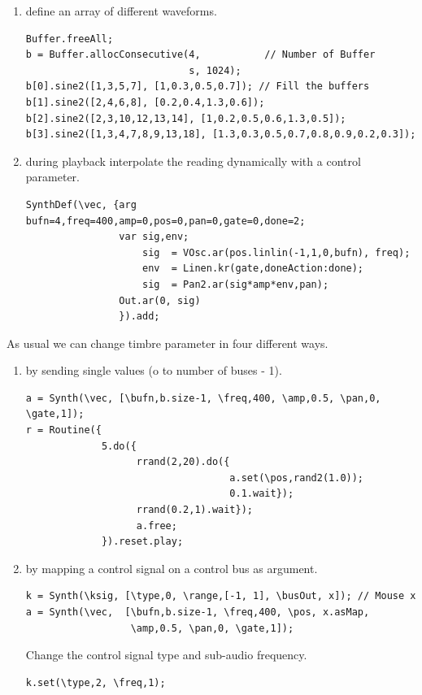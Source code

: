 \begin{enumerate}
\def\labelenumi{\arabic{enumi}.}
\tightlist
\item define an array of different waveforms.
\begin{lstlisting}[frame=single] 
Buffer.freeAll;
b = Buffer.allocConsecutive(4,           // Number of Buffer
                            s, 1024);  
b[0].sine2([1,3,5,7], [1,0.3,0.5,0.7]); // Fill the buffers
b[1].sine2([2,4,6,8], [0.2,0.4,1.3,0.6]);
b[2].sine2([2,3,10,12,13,14], [1,0.2,0.5,0.6,1.3,0.5]);
b[3].sine2([1,3,4,7,8,9,13,18], [1.3,0.3,0.5,0.7,0.8,0.9,0.2,0.3]);
\end{lstlisting}
\item during playback interpolate the reading dynamically with a control parameter.

\begin{lstlisting}[frame=single, caption=Vetorial synthesis model] 
SynthDef(\vec, {arg bufn=4,freq=400,amp=0,pos=0,pan=0,gate=0,done=2;
                var sig,env;
                    sig  = VOsc.ar(pos.linlin(-1,1,0,bufn), freq);
                    env  = Linen.kr(gate,doneAction:done);
                    sig  = Pan2.ar(sig*amp*env,pan);
                Out.ar(0, sig)
                }).add;
\end{lstlisting}
\end{enumerate}

As usual we can change timbre parameter in four different ways.

\begin{enumerate}
\def\labelenumi{\arabic{enumi}.}
\tightlist
\item by sending single values (o to number of buses - 1).
\begin{lstlisting}[frame=single] 
a = Synth(\vec, [\bufn,b.size-1, \freq,400, \amp,0.5, \pan,0, \gate,1]);            
r = Routine({
             5.do({
                   rrand(2,20).do({
                                   a.set(\pos,rand2(1.0));
                                   0.1.wait});
                   rrand(0.2,1).wait});
                   a.free;
             }).reset.play;
\end{lstlisting}

\item by mapping a control signal on a control bus as argument.
\begin{lstlisting}[frame=single] 
k = Synth(\ksig, [\type,0, \range,[-1, 1], \busOut, x]); // Mouse x  
a = Synth(\vec,  [\bufn,b.size-1, \freq,400, \pos, x.asMap, 
                  \amp,0.5, \pan,0, \gate,1]);
\end{lstlisting}

Change the control signal type and sub-audio frequency.

\begin{lstlisting}[frame=single] 
k.set(\type,2, \freq,1);
\end{lstlisting}
\end{enumerate}

